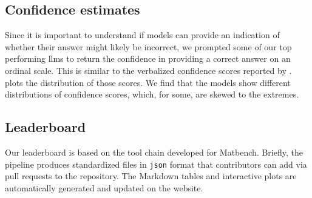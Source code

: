 \subsection{Confidence estimates} \label{sec:confidence_estimates}

Since it is important to understand if models can provide an indication of whether their answer might likely be incorrect, we prompted some of our top performing \glspl{llm} to return the confidence in providing a correct answer on an ordinal scale. 
This is similar to the verbalized confidence scores reported by \textcite{xiong2023llms}.
 plots the distribution of those scores.
We find that the models show different distributions of confidence scores, which, for some, are skewed to the extremes.



\subsection{Leaderboard}
Our leaderboard is based on the tool chain developed for Matbench.\autocite{Dunn_2020} 
Briefly, the \chembench pipeline produces standardized files in \texttt{json} format that contributors can add via pull requests to the \chembench repository.
The Markdown tables and interactive plots are automatically generated and updated on the \chembench website.

\clearpage

\printnoidxglossary[type=\acronymtype, nonumberlist]  %